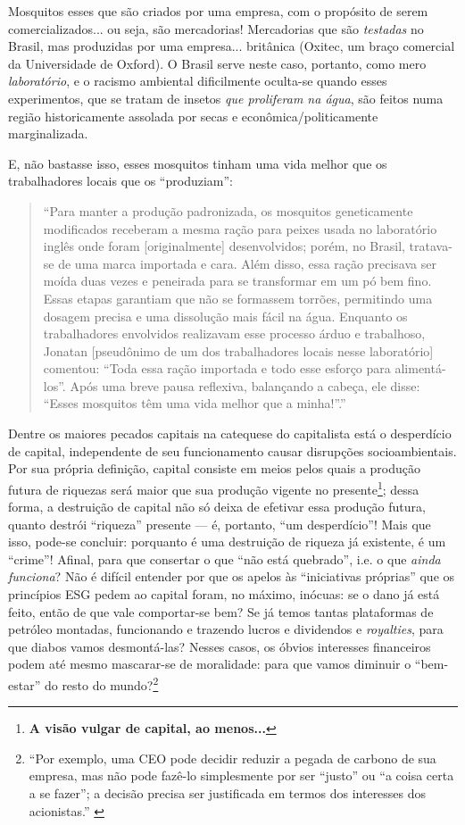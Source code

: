\documentclass[12pt]{article}
\begin{document}
Mosquitos esses que são criados por uma empresa, com o propósito de serem comercializados... ou seja, são mercadorias! Mercadorias que são \textit{testadas} no Brasil, mas produzidas por uma empresa... britânica (Oxitec, um braço comercial da Universidade de Oxford). O Brasil serve neste caso, portanto, como mero \textit{laboratório}, e o racismo ambiental dificilmente oculta-se quando esses experimentos, que se tratam de insetos \textit{que proliferam na água}, são feitos numa região historicamente assolada por secas e econômica/politicamente marginalizada. 

E, não bastasse isso, esses mosquitos tinham uma vida melhor que os trabalhadores locais que os ``produziam'':
\begin{quote}
    ``Para manter a produção padronizada, os mosquitos geneticamente modificados receberam a mesma ração para peixes usada no laboratório inglês onde foram [originalmente] desenvolvidos; porém, no Brasil, tratava-se de uma marca importada e cara. Além disso, essa ração precisava ser moída duas vezes e peneirada para se transformar em um pó bem fino. Essas etapas garantiam que não se formassem torrões, permitindo uma dosagem precisa e uma dissolução mais fácil na água. Enquanto os trabalhadores envolvidos realizavam esse processo árduo e trabalhoso, Jonatan [pseudônimo de um dos trabalhadores locais nesse laboratório] comentou: “Toda essa ração importada e todo esse esforço para alimentá-los”. Após uma breve pausa reflexiva, balançando a cabeça, ele disse: “Esses mosquitos têm uma vida melhor que a minha!”.''\cite[p. 331]{Reis-Castro2021}
\end{quote}

Dentre os maiores pecados capitais na catequese do capitalista está o desperdício de capital, independente de seu funcionamento causar disrupções socioambientais. Por sua própria definição, capital consiste em meios pelos quais a produção futura de riquezas será maior que sua produção vigente no presente\footnote{\textbf{A visão vulgar de capital, ao menos...}}; dessa forma, a destruição de capital não só deixa de efetivar essa produção futura, quanto destrói ``riqueza'' presente — é, portanto, ``um desperdício''! Mais que isso, pode-se concluir: porquanto é uma destruição de riqueza já existente, é um ``crime''! Afinal, para que consertar o que ``não está quebrado'', i.e. o que \textit{ainda funciona}? Não é difícil entender por que os apelos às ``iniciativas próprias'' que os princípios ESG pedem ao capital foram, no máximo, inócuas: se o dano já está feito, então de que vale comportar-se bem? Se já temos tantas plataformas de petróleo montadas, funcionando e trazendo lucros e dividendos e \textit{royalties}, para que diabos vamos desmontá-las? Nesses casos, os óbvios interesses financeiros podem até mesmo mascarar-se de moralidade: para que vamos diminuir o ``bem-estar'' do resto do mundo?\footnote{``Por exemplo, uma CEO pode decidir reduzir a pegada de carbono de sua empresa, mas não pode fazê-lo simplesmente por ser ``justo'' ou ``a coisa certa a se fazer''; a decisão precisa ser justificada em termos dos interesses dos acionistas.'' \cite[p. 16]{Fancy2021}}
\end{document}

